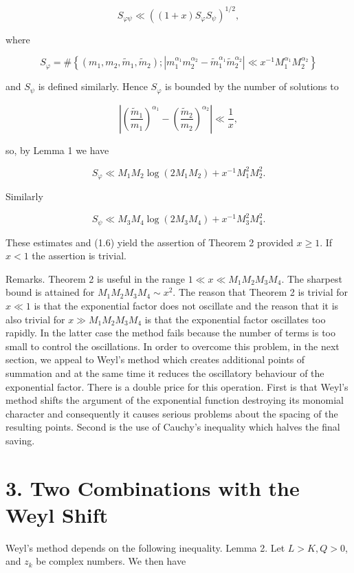 \documentclass[10pt]{article}
\begin{document}
$$
S_{\varphi \psi} \ll\left((1+x) S_{\varphi} S_{\psi}\right)^{1 / 2},
$$

where

$$
S_{\varphi}=\#\left\{\left(m_{1}, m_{2}, \tilde{m}_{1}, \tilde{m}_{2}\right) ;\left|m_{1}^{\alpha_{1}} m_{2}^{\alpha_{2}}-\tilde{m}_{1}^{\alpha_{1}} \tilde{m}_{2}^{\alpha_{2}}\right| \ll x^{-1} M_{1}^{\alpha_{1}} M_{2}^{\alpha_{2}}\right\}
$$

and $S_{\psi}$ is defined similarly. Hence $S_{\varphi}$ is bounded by the number of solutions to

$$
\left|\left(\frac{\tilde{m}_{1}}{m_{1}}\right)^{\alpha_{1}}-\left(\frac{\tilde{m}_{2}}{m_{2}}\right)^{\alpha_{2}}\right| \ll \frac{1}{x},
$$

so, by Lemma 1 we have

$$
S_{\varphi} \ll M_{1} M_{2} \log\left(2 M_{1} M_{2}\right)+x^{-1} M_{1}^{2} M_{2}^{2} .
$$

Similarly

$$
S_{\psi} \ll M_{3} M_{4} \log\left(2 M_{3} M_{4}\right)+x^{-1} M_{3}^{2} M_{4}^{2} .
$$

These estimates and (1.6) yield the assertion of Theorem 2 provided $x \geqslant 1$. If $x<1$ the assertion is trivial.

Remarks. Theorem 2 is useful in the range $1 \ll x \ll M_{1} M_{2} M_{3} M_{4}$. The sharpest bound is attained for $M_{1} M_{2} M_{3} M_{4} \sim x^{2}$. The reason that Theorem 2 is trivial for $x \ll 1$ is that the exponential factor does not oscillate and the reason that it is also trivial for $x \gg M_{1} M_{2} M_{3} M_{4}$ is that the exponential factor oscillates too rapidly. In the latter case the method fails because the number of terms is too small to control the oscillations. In order to overcome this problem, in the next section, we appeal to Weyl's method which creates additional points of summation and at the same time it reduces the oscillatory behaviour of the exponential factor. There is a double price for this operation. First is that Weyl's method shifts the argument of the exponential function destroying its monomial character and consequently it causes serious problems about the spacing of the resulting points. Second is the use of Cauchy's inequality which halves the final saving.

\section*{3. Two Combinations with the Weyl Shift}
Weyl's method depends on the following inequality.
Lemma 2. Let $L>K, Q>0$, and $z_{k}$ be complex numbers. We then have
\end{document}

